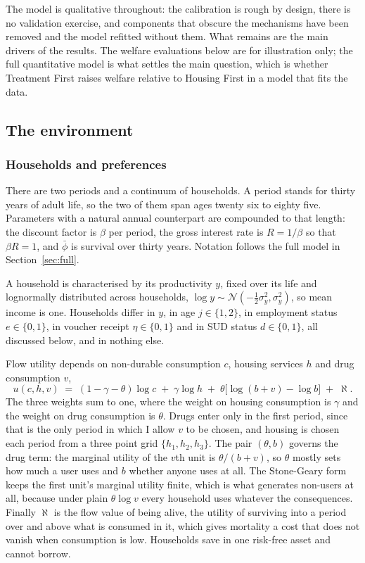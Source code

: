 \documentclass[10pt]{article}
\begin{document}
The model is qualitative throughout: the calibration is rough by design, there
is no validation exercise, and components that obscure the mechanisms have
been removed and the model refitted without them. What remains are the main
drivers of the results. The welfare evaluations below are for illustration only; the full
quantitative model is what settles the main question, which is whether Treatment
First raises welfare relative to Housing First in a model that fits the data.

\subsection{The environment}\label{sec:env}

\subsubsection{Households and preferences}

There are two periods and a continuum of households. A period stands for
thirty years of adult life, so the two of them span ages twenty six to eighty five.
Parameters with a natural annual counterpart are compounded to that length: the
discount factor is $\beta$ per period, the gross interest rate is $R=1/\beta$ so
that $\beta R = 1$, and $\bar\phi$ is survival over thirty years. Notation follows the full model in Section~\ref{sec:full}.

A household is characterised by its productivity $y$, fixed over its
life and lognormally distributed across households, $\log y \sim
\mathcal{N}(-\tfrac12\sigma_y^2, \sigma_y^2)$, so mean income is one. Households
differ in $y$, in age $j\in\{1,2\}$, in employment status $e\in\{0,1\}$, in
voucher receipt $\eta\in\{0,1\}$ and in SUD status $d\in\{0,1\}$, all
discussed below, and in nothing else.

Flow utility depends on non-durable consumption $c$, housing services $h$ and
drug consumption $v$,
\begin{equation}\label{eq:u}
u(c,h,v) \;=\; (1-\gamma-\theta)\log c \;+\; \gamma \log h
\;+\; \theta\big[\log(b+v)-\log b\big] \;+\; \aleph .
\end{equation}
The three weights sum to one, where the weight on housing consumption is $\gamma$ and the weight on drug consumption is $\theta$.
Drugs enter only in the first period, since that is the only period in which I allow $v$ to be chosen, and housing is chosen each period from a three point grid
$\{h_1,h_2,h_3\}$. The pair $(\theta,b)$ governs the drug term: the marginal
utility of the $v$th unit is $\theta/(b+v)$, so $\theta$ mostly sets how much a
user uses and $b$ whether anyone uses at all. The Stone-Geary form keeps the
first unit's marginal utility finite, which is what generates non-users at
all, because under plain $\theta\log v$ every
household uses whatever the consequences. Finally $\aleph$ is the flow value of
being alive, the utility of surviving into a period over and above what is
consumed in it, which gives mortality a cost that does not vanish when
consumption is low. Households save in one risk-free asset and cannot borrow.
\end{document}
